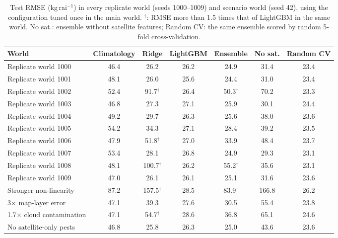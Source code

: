 \begin{table}[H]\centering\footnotesize
\caption{Test RMSE (kg\,rai$^{-1}$) in every replicate world (seeds 1000--1009) and scenario world (seed 42), using the configuration tuned once in the main world. $^{\dagger}$: RMSE more than 1.5 times that of LightGBM in the same world. No sat.: ensemble without satellite features; Random CV: the same ensemble scored by random 5-fold cross-validation.}\label{tab:worlds}
\begin{tabular}{@{}lcccccc@{}}
\toprule
World & Climatology & Ridge & LightGBM & Ensemble & No sat. & Random CV \\
\midrule
Replicate world 1000 & 46.4 & 26.2 & 26.2 & 24.9 & 31.4 & 23.4 \\
Replicate world 1001 & 48.1 & 26.0 & 25.6 & 24.4 & 31.0 & 23.4 \\
Replicate world 1002 & 52.4 & 91.7$^{\dagger}$ & 26.4 & 50.3$^{\dagger}$ & 70.2 & 23.3 \\
Replicate world 1003 & 46.8 & 27.3 & 27.1 & 25.9 & 30.1 & 24.4 \\
Replicate world 1004 & 49.2 & 29.7 & 26.3 & 25.6 & 38.0 & 23.6 \\
Replicate world 1005 & 54.2 & 34.3 & 27.1 & 28.4 & 39.2 & 23.5 \\
Replicate world 1006 & 47.9 & 51.8$^{\dagger}$ & 27.0 & 33.9 & 48.4 & 23.7 \\
Replicate world 1007 & 53.4 & 28.1 & 26.8 & 24.9 & 29.3 & 23.1 \\
Replicate world 1008 & 48.1 & 100.7$^{\dagger}$ & 26.2 & 55.2$^{\dagger}$ & 35.6 & 23.1 \\
Replicate world 1009 & 47.0 & 26.1 & 26.1 & 25.1 & 31.6 & 23.6 \\
\midrule
Stronger non-linearity & 87.2 & 157.5$^{\dagger}$ & 28.5 & 83.9$^{\dagger}$ & 166.8 & 26.2 \\
3$\times$ map-layer error & 47.1 & 39.3 & 27.6 & 30.5 & 55.4 & 23.8 \\
1.7$\times$ cloud contamination & 47.1 & 54.7$^{\dagger}$ & 28.6 & 36.8 & 65.1 & 24.6 \\
No satellite-only pests & 46.8 & 25.8 & 26.3 & 25.0 & 43.6 & 23.6 \\
\bottomrule
\end{tabular}
\end{table}